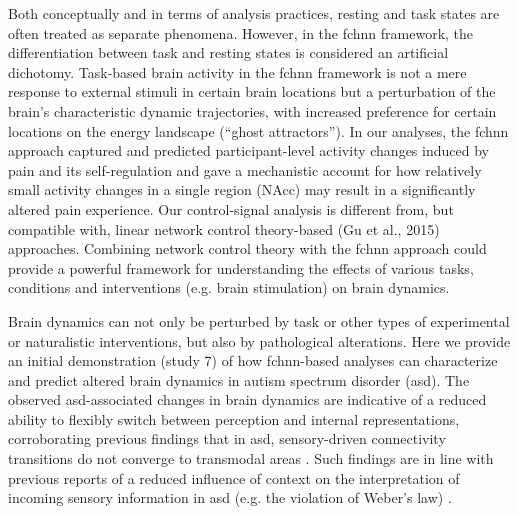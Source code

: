 \documentclass{article}
\begin{document}
Both conceptually and in terms of analysis practices, resting and task states are often treated as separate phenomena. However, in the \acrshort{fchnn} framework, the differentiation between task and resting states is considered an artificial dichotomy.
Task-based brain activity in the \acrshort{fchnn} framework is not a mere response to external stimuli in certain brain locations but a perturbation of the brain's characteristic dynamic trajectories, with increased preference for certain locations on the energy landscape (``ghost attractors'').
In our analyses, the \acrshort{fchnn} approach captured and predicted participant-level activity changes induced by pain and its self-regulation and gave a mechanistic account for how relatively small activity changes in a single region (NAcc) may result in a significantly altered pain experience.
Our control-signal analysis is different from, but compatible with, linear network control theory-based (Gu et al., 2015) approaches. Combining network control theory with the \acrshort{fchnn} approach could provide a powerful framework for understanding the effects of various tasks, conditions and interventions (e.g. brain stimulation) on brain dynamics.

Brain dynamics can not only be perturbed by task or other types of experimental or naturalistic interventions, but also by pathological alterations. Here we provide an initial demonstration (study 7) of how \acrshort{fchnn}-based analyses can characterize and predict altered brain dynamics in autism spectrum disorder (\acrshort{asd}). The observed \acrshort{asd}-associated changes in brain dynamics are indicative of a reduced ability to flexibly switch between perception and internal representations, corroborating previous findings that in \acrshort{asd}, sensory-driven connectivity transitions do not converge to transmodal areas \citep{hong2019atypical}. Such findings are in line with previous reports of a reduced influence of context on the interpretation of incoming sensory information in \acrshort{asd} (e.g. the violation of Weber's law) \citep{hadad2019perception}.
\end{document}
